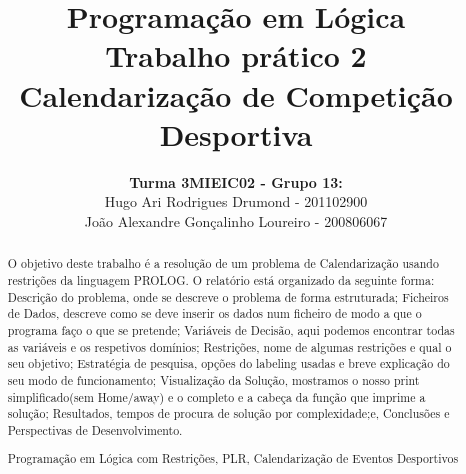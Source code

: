 \documentclass[runningheads,a4paper]{llncs}
\newcommand{\keywords}[1]{\par\addvspace\baselineskip
\noindent\keywordname\enspace\ignorespaces#1}
\begin{document}
\mainmatter

\title{Programação em Lógica\\Trabalho prático 2\\Calendarização de Competição Desportiva \linebreak}


\author{\textbf{Turma 3MIEIC02 - Grupo 13:}\\ Hugo Ari Rodrigues Drumond - 201102900 \\ João Alexandre Gonçalinho Loureiro - 200806067 \linebreak}



\maketitle

\begin{abstract}
    O objetivo deste trabalho é a resolução de um problema de Calendarização usando restrições da linguagem PROLOG. O relatório está organizado da seguinte forma: Descrição do problema, onde se descreve o problema de forma estruturada; Ficheiros de Dados, descreve como se deve inserir os dados num ficheiro de modo a que o programa faço o que se pretende; Variáveis de Decisão, aqui podemos encontrar todas as variáveis e os respetivos domínios; Restrições, nome de algumas restrições e qual o seu objetivo; Estratégia de pesquisa, opções do labeling usadas e breve explicação do seu modo de funcionamento; Visualização da Solução, mostramos o nosso print simplificado(sem Home/away) e o completo e a cabeça da função que imprime a solução; Resultados, tempos de procura de solução por complexidade;e, Conclusões e Perspectivas de Desenvolvimento.
\keywords{Programação em Lógica com Restrições, PLR, Calendarização de Eventos Desportivos}
\end{abstract}
\newpage
\end{document}
